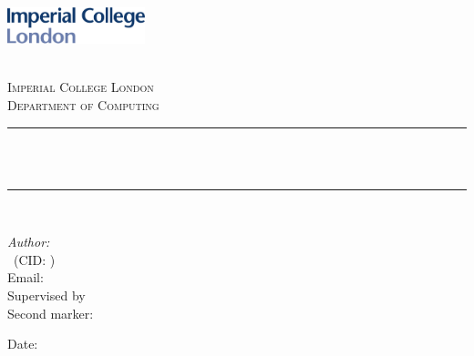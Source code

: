 \begin{titlepage}

\newcommand{\HRule}{\rule{\linewidth}{0.5mm}} %



\includegraphics[width = 4cm]{./figures/imperial}\\[0.5cm]

\begin{center} %

\textsc{\LARGE \reporttype}\\[1.5cm]
\textsc{\Large Imperial College London}\\[0.5cm]
\textsc{\large Department of Computing}\\[0.5cm]

\HRule \\[0.4cm]
{ \huge \bfseries \reporttitle}\\ %
\HRule \\[1.5cm]
\end{center}

\begin{flushleft} \large
\textit{Author:}\\
\reportauthor~(CID: \cid) \\%
Email: \email\\
Supervised by \supervisor\\
Second marker: \secondmarker\\
\end{flushleft}
\vspace{2cm}
\makeatletter
Date: \@date

\vfill %



\makeatother


\end{titlepage}

